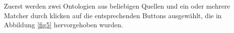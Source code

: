 		Zuerst werden zwei Ontologien aus beliebigen Quellen und ein oder
		mehrere Matcher durch klicken auf die entsprechenden Buttons ausgewählt,
		die in Abbildung \ref{fig5} hervorgehoben wurden.\\
		\begin{minipage}{\linewidth}
			\label{fig5}
		\end{minipage}
		
		\pagebreak[4]
		
